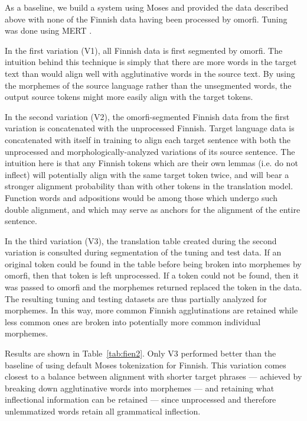 As a baseline, we build a system using Moses and provided the data described above with none of the Finnish data having been processed by omorfi.
%
Tuning was done using MERT \cite{mert}.

In the first variation (V1), all Finnish data is first segmented by omorfi.
%
The intuition behind this technique is simply that there are more words in the target text than would align well with agglutinative words in the source text.
%
By using the morphemes of the source language rather than the unsegmented words, the output source tokens might more easily align with the target tokens.  

In the second variation (V2), the omorfi-segmented Finnish data from the first variation is concatenated with the unprocessed Finnish.
%
Target language data is concatenated with itself in training to align each target sentence with both the unprocessed and morphologically-analyzed variations of its source sentence.  
%
The intuition here is that any Finnish tokens which are their own lemmas (i.e. do not inflect) will potentially align with the same target token twice, and will bear a stronger alignment probability than with other tokens in the translation model.
%
Function words and adpositions would be among those which undergo such double alignment, and which may serve as anchors for the alignment of the entire sentence.  

In the third variation (V3), the translation table created during the second variation is consulted during segmentation of the tuning and test data.
%
If an original token could be found in the table before being broken into morphemes by omorfi, then that token is left unprocessed.
%
If a token could not be found, then it was passed to omorfi and the morphemes returned replaced the token in the data.
%
The resulting tuning and testing datasets are thus partially analyzed for morphemes.
%
In this way, more common Finnish agglutinations are retained while less common ones are broken into potentially more common individual morphemes.

Results are shown in Table~\ref{tab:fien2}.
%
Only V3 performed better than the baseline of using default Moses tokenization for Finnish.  
%
This variation comes closest to a balance between alignment with shorter target phrases --- achieved by breaking down agglutinative words into morphemes --- and retaining what inflectional information can be retained --- since unprocessed and therefore unlemmatized words retain all grammatical inflection.


